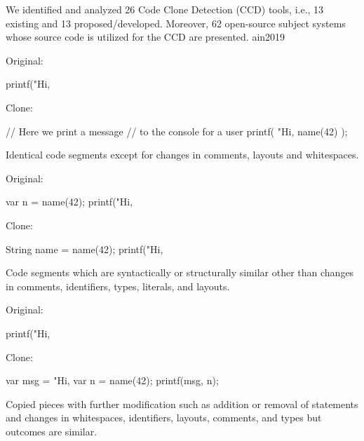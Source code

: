 \documentclass{article}
\begin{document}
  {We identified and analyzed 26 Code Clone Detection (CCD) tools, i.e., 13 existing and 13 proposed/developed. Moreover, 62 open-source subject systems whose source code is utilized for the CCD are presented.}
  {ain2019}

\begin{multicols}{2}
Original:\par
{\small\begin{ffcode}
printf("Hi, %
\end{ffcode}
}
Clone:\par
{\small\begin{ffcode}
// Here we print a message
// to the console for a user
printf(
  "Hi, %
  name(42)
);
\end{ffcode}
}
\par\columnbreak\par
Identical code segments except for changes in comments, layouts and whitespaces.
\end{multicols}
\plush{}

\begin{multicols}{2}
Original:\par
{\small\begin{ffcode}
var n = name(42);
printf("Hi, %
\end{ffcode}
}
Clone:\par
{\small\begin{ffcode}
String name = name(42);
printf("Hi, %
\end{ffcode}
}
\par\columnbreak\par
Code segments which are syntactically or structurally similar other than changes in comments, identifiers, types, literals, and layouts.
\end{multicols}
\plush{}

\begin{multicols}{2}
Original:\par
{\small\begin{ffcode}
printf("Hi, %
\end{ffcode}
}
Clone:\par
{\small\begin{ffcode}
var msg = "Hi, %
var n = name(42);
printf(msg, n);
\end{ffcode}
}
\par\columnbreak\par
Copied pieces with further modification such as addition or removal of statements and changes in whitespaces, identifiers, layouts, comments, and types but outcomes are similar.
\end{multicols}
\plush{}
\end{document}
